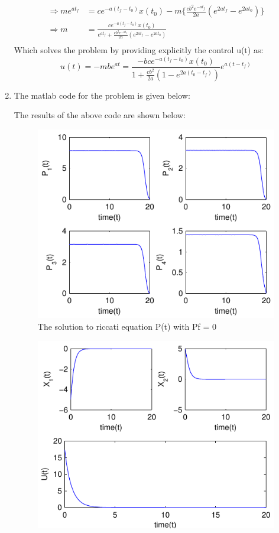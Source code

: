 \begin{enumerate}
\begin{align*}
   \Rightarrow m e^{at_f} &= c e^{-a(t_f - t_0)} x(t_0) - m \{ \frac{cb^2 e^{-at_f}}{2a} \left(e^{2at_f} - e^{2at_0}\right)\}\\
   \Rightarrow m &= \frac{c e^{-a(t_f - t_0)} x(t_0)} { e^{at_f} + \frac{cb^2 e^{-at_f}}{2a}\left( e^{2at_f} - e^{2at_0}\right)}\\
  \end{align*}
  Which solves the problem by providing explicitly the control u(t) as:
  \begin{equation*}
  u(t) = -mbe^{at} = \frac{-bc e^{-a(t_f - t_0)} x(t_0)} { 1 + \frac{cb^2}{2a}\left( 1 - e^{2a(t_0-t_f)}\right)}e^{a(t-t_f)}
  \end{equation*}
 \item The matlab code for the problem is given below:
  
  The results of the above code are shown below:
  \begin{figure}[h!]
   \includegraphics[width=\linewidth]{pic1.pdf}
   \caption{The solution to riccati equation P(t) with Pf = 0}
   \label{fig1}
  \end{figure}
  \begin{figure}[h!]
   \includegraphics[width=\linewidth]{pic2.pdf}

\end{figure}
\end{enumerate}
